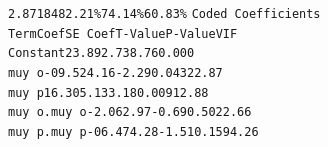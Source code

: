 \documentclass[12pt,a4paper]{article}
\newcommand{\code}[1]{\texttt{#1}}
\begin{document}
\hspace*{0.49cm}\code{2.87184}\hspace*{1cm}\code{82.21\%}\hspace*{2.15cm}\code{74.14\%}\hspace*{2.5cm}\code{60.83\%}\newpage
\noindent
\code{Coded Coefficients}\\
\code{Term}\hspace*{3cm}\code{Coef}\hspace*{1cm}\code{SE Coef}\hspace*{1cm}\code{T-Value}\hspace*{1cm}\code{P-Value}\hspace*{1cm}\code{VIF}\\
\code{Constant}\hspace*{1.8cm}\code{23.89}\hspace*{1.7cm}\code{2.73}\hspace*{1.7cm}\code{8.76}\hspace*{1.4cm}\code{0.000}\hspace*{1.5cm}\\
\code{muy o}\hspace*{2.3cm}\code{-09.52}\hspace*{1.7cm}\code{4.16}\hspace*{1.45cm}\code{-2.29}\hspace*{1.4cm}\code{0.043}\hspace*{0.5cm}\code{22.87}\\
\code{muy p}\hspace*{2.55cm}\code{16.30}\hspace*{1.7cm}\code{5.13}\hspace*{1.7cm}\code{3.18}\hspace*{1.4cm}\code{0.009}\hspace*{0.5cm}\code{12.88}\\
\code{muy o.muy o}\hspace*{1.05cm}\code{-2.06}\hspace*{1.7cm}\code{2.97}\hspace*{1.45cm}\code{-0.69}\hspace*{1.4cm}\code{0.502}\hspace*{0.75cm}\code{2.66}\\
\code{muy p.muy p}\hspace*{0.8cm}\code{-06.47}\hspace*{1.7cm}\code{4.28}\hspace*{1.45cm}\code{-1.51}\hspace*{1.4cm}\code{0.159}\hspace*{0.75cm}\code{4.26}\\
\end{document}
